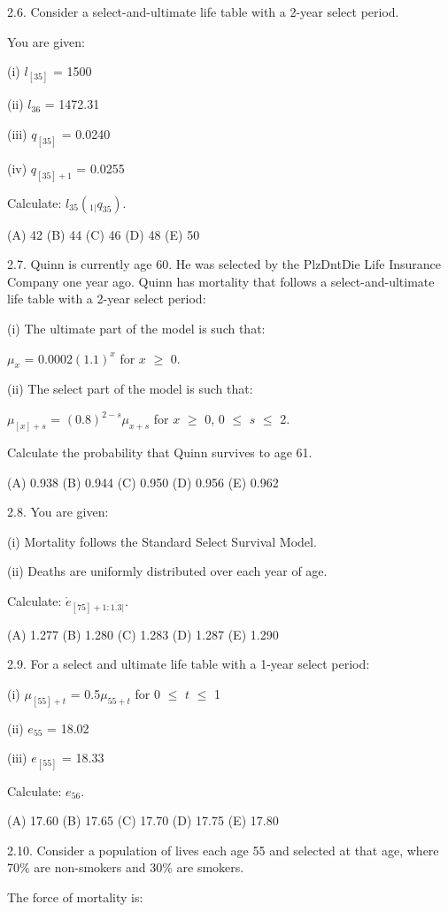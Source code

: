 \documentclass[]{book}
\begin{document}
2.6. Consider a select-and-ultimate life table with a 2-year select
period.

You are given:

(i) \(l_{[35]}\) = 1500

(ii) \(l_{36}\) = 1472.31

(iii) \(q_{[35]}\) = 0.0240

(iv) \(q_{[35] + 1}\) = 0.0255

Calculate: \(l_{35}({}_{1|}q_{35})\).

(A) 42 (B) 44 (C) 46 (D) 48 (E) 50

2.7. Quinn is currently age 60. He was selected by the PlzDntDie Life
Insurance Company one year ago. Quinn has mortality that follows a
select-and-ultimate life table with a 2-year select period:

(i) The ultimate part of the model is such that:

\(\mu_x\) = 0.0002\((1.1)^x\) for \(x\) \(\ge\) 0.

(ii) The select part of the model is such that:

\(\mu_{[x] + s}\) = \((0.8)^{2 - s}\mu_{x + s}\) for \(x\) \(\ge\) 0, 0
\(\le\) \(s\) \(\le\) 2.

Calculate the probability that Quinn survives to age 61.

(A) 0.938 (B) 0.944 (C) 0.950 (D) 0.956 (E) 0.962

2.8. You are given:

(i) Mortality follows the Standard Select Survival Model.

(ii) Deaths are uniformly distributed over each year of age.

Calculate: \(\mathring{e}_{[75] + 1 :\overline{1.3}|}\).

(A) 1.277 (B) 1.280 (C) 1.283 (D) 1.287 (E) 1.290

2.9. For a select and ultimate life table with a 1-year select period:

(i) \(\mu_{[55] + t}\) = 0.5\(\mu_{55 + t}\) for 0 \(\le\) \(t\) \(\le\)
1

(ii) \(e_{55}\) = 18.02

(iii) \(e_{[55]}\) = 18.33

Calculate: \(e_{56}\).

(A) 17.60 (B) 17.65 (C) 17.70 (D) 17.75 (E) 17.80

2.10. Consider a population of lives each age 55 and selected at that
age, where 70\% are non-smokers and 30\% are smokers.

The force of mortality is:
\end{document}
